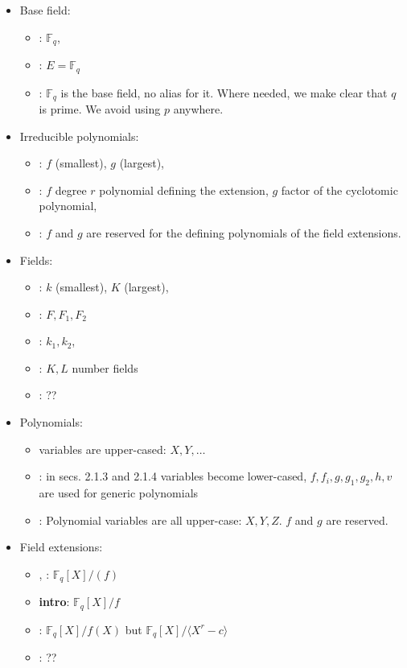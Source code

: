 \documentclass[12pt]{article}
\theoremstyle{plain}
\theoremstyle{definition}
\newcommand{\ang}[1]{\langle#1\rangle}
\def\F{\ensuremath{\mathbb{F}}}
\begin{document}
\begin{itemize}
\item Base field: 
  \begin{itemize}
  \item \cons: $\F_q$,
  \item \kummer: $E=\F_q$
  \item \prop: $\F_q$ is the base field, no alias for it. Where
    needed, we make clear that $q$ is prime. We avoid using $p$
    anywhere.
  \end{itemize}
\item Irreducible polynomials:
  \begin{itemize}
  \item \poster: $f$ (smallest), $g$ (largest),
  \item \kummer: $f$ degree $r$ polynomial defining the extension, $g$
    factor of the cyclotomic polynomial,
  \item \prop: $f$ and $g$ are reserved for the defining polynomials of the
    field extensions.
  \end{itemize}
\item Fields:
  \begin{itemize}
  \item \poster: $k$ (smallest), $K$ (largest),
  \item \kummer: $F,F_1,F_2$ 
  \item \rains: $k_1,k_2$, 
  \item \rains: $K,L$ number fields
  \item \prop: ??
  \end{itemize}
\item Polynomials: 
  \begin{itemize}
  \item \cons{} variables are upper-cased: $X,Y,\dots$
  \item \kummer: in secs. 2.1.3 and 2.1.4 variables become lower-cased,
    $f,f_i,g,g_1,g_2,h,v$ are used for generic polynomials
  \item \prop: Polynomial variables are all upper-case: $X,Y,Z$. $f$ and $g$ are reserved.
  \end{itemize}
\item Field extensions:
  \begin{itemize}
  \item \poster, \rains: $\F_q[X]/(f)$
  \item \textbf{intro}: $\F_q[X]/f$
  \item \kummer: $\F_q[X]/f(X)$ but $\F_q[X]/\ang{X^r-c}$
  \item \prop: ??

\end{itemize}
\end{itemize}
\end{document}
